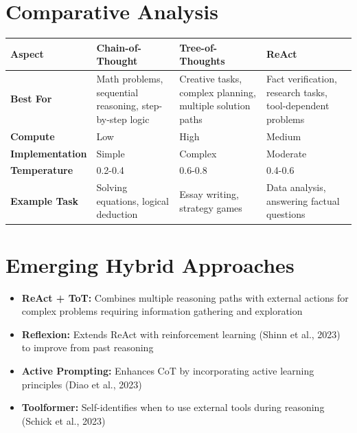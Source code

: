 \documentclass[12pt,letterpaper]{article}
\begin{document}
\section{Comparative Analysis}

\begin{center}
\begin{tabular}{|p{3cm}|p{4cm}|p{4cm}|p{4cm}|}
\hline
\small{\textbf{\textcolor{accentColor}{Aspect}}} & \small{\textbf{\textcolor{accentColor}{Chain-of-Thought}}} & \small{\textbf{\textcolor{accentColor}{Tree-of-Thoughts}}} & \small{\textbf{\textcolor{accentColor}{ReAct}}} \\
\hline
\small{\textbf{\textcolor{pythonBlue}{Best For}}} & 
\small{Math problems, sequential reasoning, step-by-step logic} & 
\small{Creative tasks, complex planning, multiple solution paths} & 
\small{Fact verification, research tasks, tool-dependent problems} \\
\hline
\small{\textbf{\textcolor{pythonBlue}{Compute}}} & 
\small{Low} & 
\small{High} & 
\small{Medium} \\
\hline
\small{\textbf{\textcolor{pythonBlue}{Implementation}}} & 
\small{Simple} & 
\small{Complex} & 
\small{Moderate} \\
\hline
\small{\textbf{\textcolor{pythonBlue}{Temperature}}} & 
\small{0.2-0.4} & 
\small{0.6-0.8} & 
\small{0.4-0.6} \\
\hline
\small{\textbf{\textcolor{pythonBlue}{Example Task}}} & 
\small{Solving equations, logical deduction} & 
\small{Essay writing, strategy games} & 
\small{Data analysis, answering factual questions} \\
\hline
\end{tabular}
\end{center}

\section{Emerging Hybrid Approaches}

\begin{itemize}
    \item \textbf{\textcolor{pythonBlue}{ReAct + ToT:}} Combines multiple reasoning paths with external actions for complex problems requiring information gathering and exploration
    
    \item \textbf{\textcolor{pythonBlue}{Reflexion:}} Extends ReAct with reinforcement learning (Shinn et al., 2023) to improve from past reasoning
    
    \item \textbf{\textcolor{pythonBlue}{Active Prompting:}} Enhances CoT by incorporating active learning principles (Diao et al., 2023)
    
    \item \textbf{\textcolor{pythonBlue}{Toolformer:}} Self-identifies when to use external tools during reasoning (Schick et al., 2023)
\end{itemize}
\end{document}
